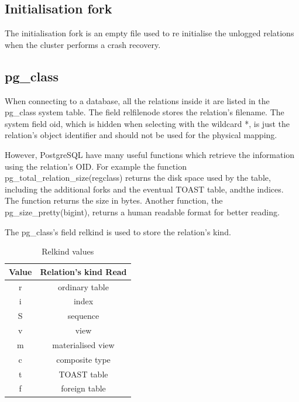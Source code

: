 \subsection{Initialisation fork}
The initialisation fork is an empty file used to re initialise the unlogged relations 
when the cluster performs a crash recovery.

\subsection{pg\_class}
When connecting to a database, all the relations inside it are listed in the 
pg\_class system table. The field relfilenode stores the relation's 
filename. The system field oid, which is hidden when selecting with the wildcard *, is 
just the relation's object identifier and should not be used for the physical 
mapping.\newline

However, PostgreSQL have many useful functions which retrieve the information 
using the relation's OID. For example the function pg\_total\_relation\_size(regclass) 
returns the disk space used by the table, including the additional forks and the eventual 
TOAST table, andthe indices. The function returns the size in bytes. Another function, 
the pg\_size\_pretty(bigint), returns a human readable format for better reading.\newline

The pg\_class's field relkind is used to store the relation's kind.

\begin{table}[h]
  \begin{tabular}{cc}
    Value & Relation's kind 
Read\\ 
    \hline
    r  &  ordinary table \\
    i  &  index \\
    S  &  sequence \\
    v  &  view \\
    m  &  materialised view \\
    c  &  composite type \\
    t  &  TOAST table \\
    f  &  foreign table \\
    
  \end{tabular}
  \caption{\label{tab:RELKIND}Relkind values}
\end{table}

